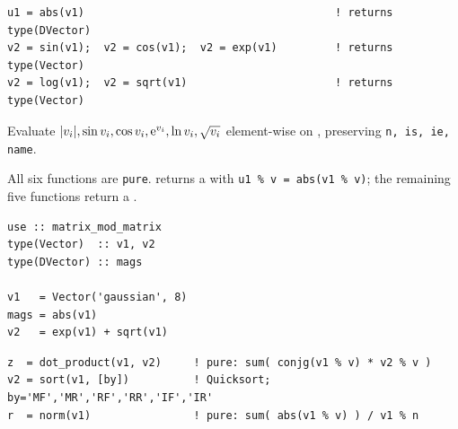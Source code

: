 \lstset{language=[95]Fortran}
\begin{lstlisting}
u1 = abs(v1)                                       ! returns type(DVector)
v2 = sin(v1);  v2 = cos(v1);  v2 = exp(v1)         ! returns type(Vector)
v2 = log(v1);  v2 = sqrt(v1)                       ! returns type(Vector)
\end{lstlisting}

Evaluate $|v_i|, \sin v_i, \cos v_i, {\rm e}^{v_i}, \ln v_i, \sqrt{v_i}$ element-wise on , preserving \texttt{n, is, ie, name}.

All six functions are \texttt{pure}.  returns a  with \texttt{u1 \% v = abs(v1 \% v)}; the remaining five functions return a .

\begin{description}[leftmargin=2.2cm, style=nextline]
\end{description}

\lstset{language=[95]Fortran}
\begin{lstlisting}
use :: matrix_mod_matrix
type(Vector)  :: v1, v2
type(DVector) :: mags

v1   = Vector('gaussian', 8)
mags = abs(v1)
v2   = exp(v1) + sqrt(v1)
\end{lstlisting}



\lstset{language=[95]Fortran}
\begin{lstlisting}
z  = dot_product(v1, v2)     ! pure: sum( conjg(v1 % v) * v2 % v )
v2 = sort(v1, [by])          ! Quicksort; by='MF','MR','RF','RR','IF','IR'
r  = norm(v1)                ! pure: sum( abs(v1 % v) ) / v1 % n
\end{lstlisting}

